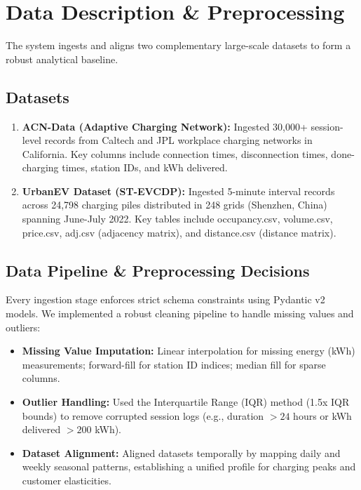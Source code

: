 \documentclass[11pt,a4paper]{article}
\begin{document}
\section{Data Description \& Preprocessing}
The system ingests and aligns two complementary large-scale datasets to form a robust analytical baseline.

\subsection{Datasets}
\begin{enumerate}
    \item \textbf{ACN-Data (Adaptive Charging Network):} Ingested 30,000+ session-level records from Caltech and JPL workplace charging networks in California. Key columns include connection times, disconnection times, done-charging times, station IDs, and kWh delivered.
    \item \textbf{UrbanEV Dataset (ST-EVCDP):} Ingested 5-minute interval records across 24,798 charging piles distributed in 248 grids (Shenzhen, China) spanning June-July 2022. Key tables include occupancy.csv, volume.csv, price.csv, adj.csv (adjacency matrix), and distance.csv (distance matrix).
\end{enumerate}

\begin{table}[H]
\centering
\caption{Dataset Structural Characteristics}
\label{tab:datasets}
\end{table}

\subsection{Data Pipeline \& Preprocessing Decisions}
Every ingestion stage enforces strict schema constraints using Pydantic v2 models. We implemented a robust cleaning pipeline to handle missing values and outliers:
\begin{itemize}
    \item \textbf{Missing Value Imputation:} Linear interpolation for missing energy (kWh) measurements; forward-fill for station ID indices; median fill for sparse columns.
    \item \textbf{Outlier Handling:} Used the Interquartile Range (IQR) method (1.5x IQR bounds) to remove corrupted session logs (e.g., duration $>24$ hours or kWh delivered $>200$ kWh).
    \item \textbf{Dataset Alignment:} Aligned datasets temporally by mapping daily and weekly seasonal patterns, establishing a unified profile for charging peaks and customer elasticities.
\end{itemize}
\end{document}
